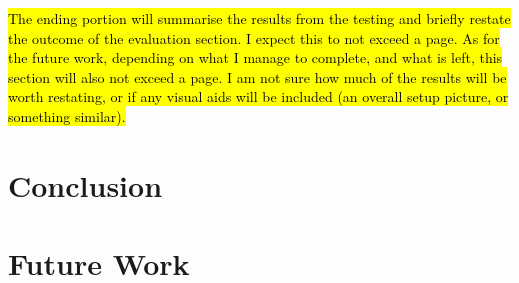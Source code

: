 \documentclass[main.tex]{subfiles}
\begin{document}
\hl{The ending portion will summarise the results from the testing and briefly restate the outcome of the evaluation section. I expect this to not exceed a page. As for the future work, depending on what I manage to complete, and what is left, this section will also not exceed a page. I am not sure how much of the results will be worth restating, or if any visual aids will be included (an overall setup picture, or something similar).}

\section{Conclusion}
\section{Future Work}
\end{document}

